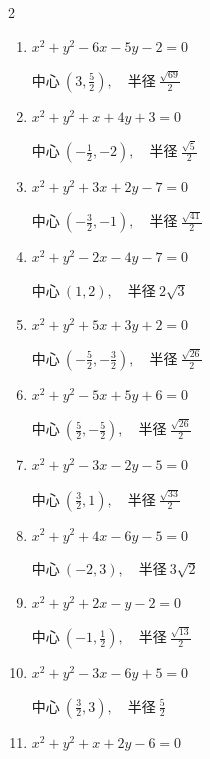 \begin{multicols}{2}
\begin{enumerate}
  \item $x^{2}+y^{2}-6x-5y-2=0$

        $\displaystyle 中心\: \left(3,\frac{5}{2}\right), \quad 半径 \ \frac{\sqrt{69}}{2}$

  \item $x^{2}+y^{2}+x+4y+3=0$

        $\displaystyle 中心\: \left(-\frac{1}{2},-2\right), \quad 半径 \ \frac{\sqrt{5}}{2}$

  \item $x^{2}+y^{2}+3x+2y-7=0$

        $\displaystyle 中心\: \left(-\frac{3}{2},-1\right), \quad 半径 \ \frac{\sqrt{41}}{2}$

  \item $x^{2}+y^{2}-2x-4y-7=0$

        $\displaystyle 中心\: \left(1,2\right), \quad 半径 \ 2\sqrt{3}$

  \item $x^{2}+y^{2}+5x+3y+2=0$

        $\displaystyle 中心\: \left(-\frac{5}{2},-\frac{3}{2}\right), \quad 半径 \ \frac{\sqrt{26}}{2}$

\columnbreak %

\resetques

  \item $x^{2}+y^{2}-5x+5y+6=0$

        $\displaystyle 中心\: \left(\frac{5}{2},-\frac{5}{2}\right), \quad 半径 \ \frac{\sqrt{26}}{2}$

  \item $x^{2}+y^{2}-3x-2y-5=0$

        $\displaystyle 中心\: \left(\frac{3}{2},1\right), \quad 半径 \ \frac{\sqrt{33}}{2}$

  \item $x^{2}+y^{2}+4x-6y-5=0$

        $\displaystyle 中心\: \left(-2,3\right), \quad 半径 \ 3\sqrt{2}$

  \item $x^{2}+y^{2}+2x-y-2=0$

        $\displaystyle 中心\: \left(-1,\frac{1}{2}\right), \quad 半径 \ \frac{\sqrt{13}}{2}$

  \item $x^{2}+y^{2}-3x-6y+5=0$

        $\displaystyle 中心\: \left(\frac{3}{2},3\right), \quad 半径 \ \frac{5}{2}$

  \item $x^{2}+y^{2}+x+2y-6=0$


\end{enumerate}
\end{multicols}
